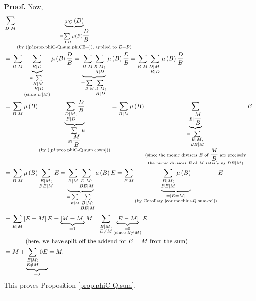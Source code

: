 \documentclass[numbers=enddot,12pt,final,onecolumn,notitlepage]{scrartcl}%
\theoremstyle{definition}
\newenvironment{proof}[1][Proof]{\noindent\textbf{#1.} }{\ \rule{0.5em}{0.5em}}
\let\sumnonlimits\sum
\renewcommand{\sum}{\sumnonlimits\limits}
\begin{document}
\begin{proof}
Now,%
\begin{align*}
&  \sum\limits_{D\mid M}\underbrace{\varphi_{C}\left(  D\right)
}_{\substack{=\sum_{B\mid D}\mu\left(  B\right)  \dfrac{D}{B}\\\text{(by
(\ref{pf.prop.phiC-Q.sum.phiCE=}), applied to }E=D\text{)}}}\\
&  =\sum\limits_{D\mid M}\underbrace{\sum_{B\mid D}}_{\substack{=\sum
_{\substack{B\mid M;\\B\mid D}}\\\text{(since }D\mid M\text{)}}}\mu\left(
B\right)  \dfrac{D}{B}=\underbrace{\sum\limits_{D\mid M}\sum_{\substack{B\mid
M;\\B\mid D}}}_{=\sum_{B\mid M}\sum_{\substack{D\mid M;\\B\mid D}}}\mu\left(
B\right)  \dfrac{D}{B}=\sum_{B\mid M}\sum_{\substack{D\mid M;\\B\mid D}%
}\mu\left(  B\right)  \dfrac{D}{B}\\
&  =\sum_{B\mid M}\mu\left(  B\right)  \underbrace{\sum_{\substack{D\mid
M;\\B\mid D}}\dfrac{D}{B}}_{\substack{=\sum_{E\mid\dfrac{M}{B}}E\\\text{(by
(\ref{pf.prop.phiC-Q.sum.down}))}}}=\sum_{B\mid M}\mu\left(  B\right)
\underbrace{\sum_{E\mid\dfrac{M}{B}}}_{\substack{=\sum_{\substack{E\mid
M;\\BE\mid M}}\\\text{(since the monic divisors }E\text{ of }\dfrac{M}%
{B}\text{ are precisely}\\\text{the monic divisors }E\text{ of }M\text{
satisfying }BE\mid M\text{)}}}E\\
&  =\sum_{B\mid M}\mu\left(  B\right)  \sum_{\substack{E\mid M;\\BE\mid
M}}E=\underbrace{\sum_{B\mid M}\sum_{\substack{E\mid M;\\BE\mid M}}}%
_{=\sum_{E\mid M}\sum_{\substack{B\mid M;\\BE\mid M}}}\mu\left(  B\right)
E=\sum_{E\mid M}\underbrace{\sum_{\substack{B\mid M;\\BE\mid M}}\mu\left(
B\right)  }_{\substack{=\left[  E=M\right]  \\\text{(by Corollary
\ref{cor.moebius-Q.sum-rel})}}}E\\
&  =\sum_{E\mid M}\left[  E=M\right]  E=\underbrace{\left[  M=M\right]  }%
_{=1}M+\sum_{\substack{E\mid M;\\E\neq M}}\underbrace{\left[  E=M\right]
}_{\substack{=0\\\text{(since }E\neq M\text{)}}}E\\
&  \ \ \ \ \ \ \ \ \ \ \left(  \text{here, we have split off the addend for
}E=M\text{ from the sum}\right) \\
&  =M+\underbrace{\sum_{\substack{E\mid M;\\E\neq M}}0E}_{=0}=M.
\end{align*}
This proves Proposition \ref{prop.phiC-Q.sum}.
\end{proof}
\end{document}
